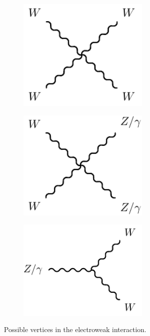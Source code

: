 \begin{figure}
\begin{subfigure}[b]{0.33\linewidth}
		\caption{\label{fig:gamma_fermion_vertex}}
	\end{subfigure}
	\begin{subfigure}[b]{0.33\linewidth}
		\centering\includegraphics[width=0.7\textwidth]{w_boson_quartic_vertex}
		\caption{\label{fig:w_boson_quartic_vertex}}
	\end{subfigure}%
	\begin{subfigure}[b]{0.33\linewidth}
		\centering\includegraphics[width=0.7\textwidth]{wz_boson_quartic_vertex}
		\caption{\label{fig:wz_boson_quartic_vertex}}
	\end{subfigure}	
	\begin{subfigure}[b]{0.33\linewidth}
		\centering\includegraphics[width=0.7\textwidth]{w_boson_cubic_vertex}
		\caption{\label{fig:w_boson_cubic_vertex}}
	\end{subfigure}
	\caption{Possible vertices in the electroweak interaction.}
	\label{fig:ewk_vertices}
\end{figure}

